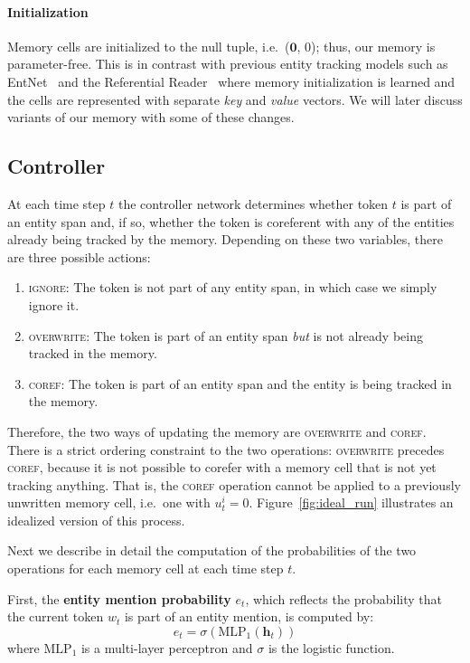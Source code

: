 \documentclass[12pt]{thesis-umich}[thesis]
\def\vec#1{\ensuremath{\boldsymbol{{#1}}}}
\newcommand{\actignore}{\textsc{ignore}\xspace}
\newcommand{\actcoref}{\textsc{coref}\xspace}
\newcommand{\actoverwrite}{\textsc{overwrite}\xspace}
\newcommand{\mlp}{\mathrm{MLP}}
\begin{document}
\paragraph{Initialization}
Memory cells are initialized to the null tuple, i.e.\ (\vec{0}, 0); thus, our memory is parameter-free. This is in contrast with previous entity tracking models such as EntNet~\cite{henaff2016tracking} and the Referential Reader~\cite{liu2019referential} where memory initialization is learned and the cells are represented with separate {\it key} and {\it value} vectors.
We will later discuss variants of our memory with some of these changes.




\subsection{Controller}
At each time step $t$ the controller network determines whether token $t$ is part of an entity span and, if so, whether the token is coreferent with any of the entities already being tracked by the memory. Depending on these two
variables, there are three possible actions: \begin{enumerate}[label=(\roman*)]
	\itemsep0em
	\item \actignore: The token is not part of any entity span, in which case we simply ignore it.
	\item \actoverwrite: The token is part of an entity span \emph{but} is not already being tracked in the memory.
	\item \actcoref: The token is part of an entity span and the entity is being tracked in the memory.
\end{enumerate}
Therefore, the two ways of updating the memory are \actoverwrite and \actcoref.
There is a strict ordering constraint to the two operations: \actoverwrite precedes \actcoref, because it is not possible to corefer with a memory cell that is not yet tracking anything. That is, the \actcoref operation cannot be applied to a previously unwritten memory cell, i.e.~one with $u^i_t = 0$. Figure~\ref{fig:ideal_run} illustrates an idealized version of this process.

Next we describe in detail the computation of the probabilities of the two operations for each memory cell at each time step $t$.

First, the {\bf entity mention probability} $e_t$, which reflects the probability that the current token $w_t$ is part of an entity mention, is computed by:
\begin{equation} \label{ent_eqn}
	e_t = \sigma(\mlp_1(\vec{h}_t))
\end{equation}
where $\mlp_1$ is a multi-layer perceptron and $\sigma$ is the logistic function.
\end{document}
